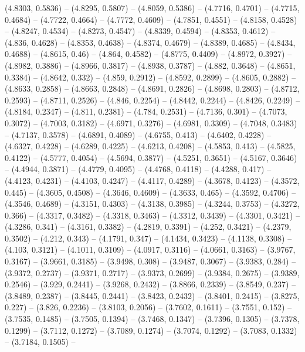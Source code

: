{   (4.8303, 0.5836) -- (4.8295, 0.5807) -- (4.8059, 0.5386) -- (4.7716, 0.4701) 
  -- (4.7715, 0.4684) -- (4.7722, 0.4664) -- (4.7772, 0.4609) -- (4.7851, 
  0.4551) -- (4.8158, 0.4528) -- (4.8247, 0.4534) -- (4.8273, 0.4547) -- 
  (4.8339, 0.4594) -- (4.8353, 0.4612) -- (4.836, 0.4628) -- (4.8353, 0.4638) --
   (4.8374, 0.4679) -- (4.8389, 0.4685) -- (4.8434, 0.4688) -- (4.8615, 0.46) --
   (4.864, 0.4582) -- (4.8775, 0.4409) -- (4.8972, 0.3927) -- (4.8982, 0.3886) 
  -- (4.8966, 0.3817) -- (4.8938, 0.3787) -- (4.882, 0.3648) -- (4.8651, 0.3384)
   -- (4.8642, 0.332) -- (4.859, 0.2912) -- (4.8592, 0.2899) -- (4.8605, 0.2882)
   -- (4.8633, 0.2858) -- (4.8663, 0.2848) -- (4.8691, 0.2826) -- (4.8698, 
  0.2803) -- (4.8712, 0.2593) -- (4.8711, 0.2526) -- (4.846, 0.2254) -- (4.8442,
   0.2244) -- (4.8426, 0.2249) -- (4.8184, 0.2347) -- (4.811, 0.2381) -- (4.784,
   0.2531) -- (4.7136, 0.301) -- (4.7073, 0.3072) -- (4.7003, 0.3182) -- 
  (4.6971, 0.3276) -- (4.6981, 0.3309) -- (4.7048, 0.3483) -- (4.7137, 0.3578) 
  -- (4.6891, 0.4089) -- (4.6755, 0.413) -- (4.6402, 0.4228) -- (4.6327, 0.4228)
   -- (4.6289, 0.4225) -- (4.6213, 0.4208) -- (4.5853, 0.413) -- (4.5825, 
  0.4122) -- (4.5777, 0.4054) -- (4.5694, 0.3877) -- (4.5251, 0.3651) -- 
  (4.5167, 0.3646) -- (4.4944, 0.3871) -- (4.4779, 0.4095) -- (4.4768, 0.4118) 
  -- (4.4288, 0.417) -- (4.4123, 0.4231) -- (4.4103, 0.4247) -- (4.4117, 0.4289)
   -- (4.3678, 0.4123) -- (4.3572, 0.445) -- (4.3605, 0.4508) -- (4.3646, 
  0.4609) -- (4.3633, 0.465) -- (4.3592, 0.4706) -- (4.3546, 0.4689) -- (4.3151,
   0.4303) -- (4.3138, 0.3985) -- (4.3244, 0.3753) -- (4.3272, 0.366) -- 
  (4.3317, 0.3482) -- (4.3318, 0.3463) -- (4.3312, 0.3439) -- (4.3301, 0.3421) 
  -- (4.3286, 0.341) -- (4.3161, 0.3382) -- (4.2819, 0.3391) -- (4.252, 0.3421) 
  -- (4.2379, 0.3502) -- (4.212, 0.343) -- (4.1791, 0.347) -- (4.1434, 0.3423) 
  -- (4.1138, 0.3308) -- (4.103, 0.3121) -- (4.1011, 0.3109) -- (4.0917, 0.3116)
   -- (4.0661, 0.3163) -- (3.9767, 0.3167) -- (3.9661, 0.3185) -- (3.9498, 
  0.308) -- (3.9487, 0.3067) -- (3.9383, 0.284) -- (3.9372, 0.2737) -- (3.9371, 
  0.2717) -- (3.9373, 0.2699) -- (3.9384, 0.2675) -- (3.9389, 0.2546) -- (3.929,
   0.2441) -- (3.9268, 0.2432) -- (3.8866, 0.2339) -- (3.8549, 0.237) -- 
  (3.8489, 0.2387) -- (3.8445, 0.2441) -- (3.8423, 0.2432) -- (3.8401, 0.2415) 
  -- (3.8275, 0.227) -- (3.826, 0.2236) -- (3.8103, 0.2056) -- (3.7602, 0.1611) 
  -- (3.7551, 0.152) -- (3.7535, 0.1485) -- (3.7505, 0.1394) -- (3.7468, 0.1347)
   -- (3.7396, 0.1305) -- (3.7378, 0.1299) -- (3.7112, 0.1272) -- (3.7089, 
  0.1274) -- (3.7074, 0.1292) -- (3.7083, 0.1332) -- (3.7184, 0.1505) -- 
}

